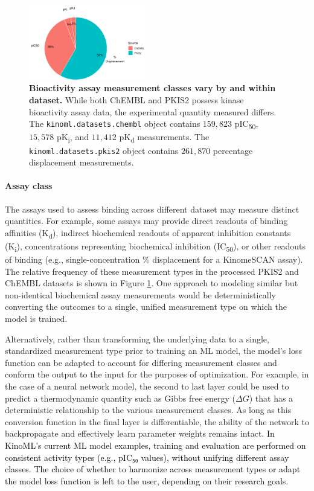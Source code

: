 \documentclass[9pt,lessons]{livecoms}
\newcommand{\revision}[1]{\textcolor{black}{#1}}
\begin{document}
\begin{figure}[bph]
    \centering
    \includegraphics[width=0.45\textwidth]{figures/measurement_piechart.png}
    \caption{\label{figure:piechart}
    {\bf Bioactivity assay measurement classes vary by and within dataset. } While both ChEMBL and PKIS2 possess kinase bioactivity assay data, the experimental quantity measured differs. The \texttt{kinoml.datasets.chembl} object contains $159,823$ pIC\textsubscript{50}, $15,578$ pK\textsubscript{i}, and $11,412$ pK\textsubscript{d} measurements. The \texttt{kinoml.datasets.pkis2} object contains $261,870$ percentage displacement measurements.}
\end{figure}

\paragraph{Assay class}

The assays used to assess binding across different dataset may measure distinct quantities. For example, some assays may provide direct readouts of binding affinities (K\textsubscript{d}), indirect biochemical readouts of apparent inhibition constants (K\textsubscript{i}), concentrations representing biochemical inhibition (IC\textsubscript{50}), or other readouts of binding (e.g., single-concentration \% displacement for a KinomeSCAN assay). The relative frequency of these measurement types in the processed PKIS2 and ChEMBL datasets is shown in Figure \ref{figure:piechart}. One approach to modeling similar but non-identical biochemical assay measurements would be deterministically converting the outcomes to a single, unified measurement type on which the model is trained.

Alternatively, rather than transforming the underlying data to a single, standardized measurement type prior to training an ML model, the model's loss function can be adapted to account for differing measurement classes and conform the output to the input for the purposes of optimization. For example, in the case of a neural network model, the second to last layer could be used to predict a thermodynamic quantity such as Gibbs free energy ($\Delta G$) that has a deterministic relationship to the various measurement classes. As long as this conversion function in the final layer is differentiable, the ability of the network to backpropagate and effectively learn parameter weights remains intact. \revision{In KinoML’s current ML model examples, training and evaluation are performed on consistent activity types (e.g., pIC₅₀ values), without unifying different assay classes. The choice of whether to harmonize across measurement types or adapt the model loss function is left to the user, depending on their research goals.}
\end{document}
